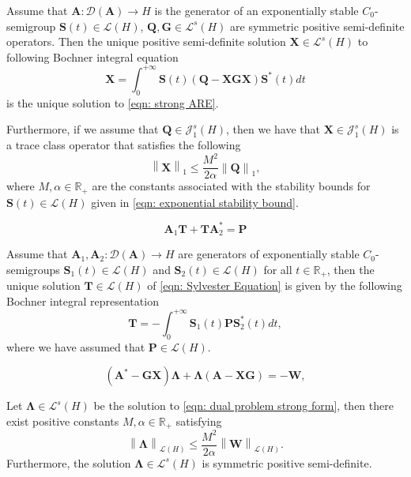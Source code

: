 \documentclass[10pt,a4paper]{amsart}
\newcommand{\bA}{\mathbf A}
\newcommand{\bG}{\mathbf G}
\newcommand{\bLambda}{\boldsymbol{\Lambda}}
\newcommand{\bQ}{\mathbf Q}
\newcommand{\bS}{\mathbf S}
\newcommand{\bT}{\mathbf T}
\newcommand{\bW}{\mathbf W}
\newcommand{\bX}{\mathbf X}
\newcommand{\norm}[1]{\left\| #1 \right\|}
\newcommand{\p}[1]{\left( {#1} \right)}
\newcommand{\sJ}{\mathscr J}
\newcommand{\sL}{\mathscr L}
\begin{document}
\begin{theorem} \label{theorem: ARE well-posedness}
Assume that $\bA : \mathcal D(\bA) \rightarrow H$ is the generator of an exponentially stable $C_0$-semigroup $\bS(t)\in \sL(H)$, $\bQ, \bG \in \sL^s(H)$ are symmetric positive semi-definite operators. Then the unique positive semi-definite solution $\bX \in \sL^s(H)$ to following Bochner integral equation
\begin{equation} \label{eqn: Bochner ARE}
    \bX = \int_0^{+\infty} \bS(t)\p{\bQ - \bX \bG \bX}\bS^*(t)dt
\end{equation}
is the unique solution to \eqref{eqn: strong ARE}. 

Furthermore, if we assume that $\bQ \in \sJ^s_1(H)$, then we have that $\bX \in \sJ_1^s(H)$ is a trace class operator that satisfies the following
\begin{equation} \label{eqn: ARE solution bound}
    \norm{\bX}_{1} \leq \frac{M^2}{2\alpha} \norm{\bQ}_{1},
\end{equation}
where $M,\alpha \in \mathbb R_+$ are the constants associated with the stability bounds for $\bS(t) \in \sL(H)$ given in \eqref{eqn: exponential stability bound}.
\end{theorem}

\begin{equation} \label{eqn: Sylvester Equation}
    \bA_1 \bT + \bT \bA_2^* = \mathbf P
\end{equation}

\begin{lemma} \label{lemma: Sylvester Equation}
    Assume that $\bA_1, \bA_2: \mathcal D(\bA) \rightarrow H$ are generators of exponentially stable $C_0$-semigroups $\bS_1(t) \in \sL\p{H}$ and $\bS_2(t) \in \sL\p{H}$ for all $t \in \mathbb R_+$, then the unique solution $\mathbf T \in \sL\p{H}$ of \eqref{eqn: Sylvester Equation} is given by the following Bochner integral representation
    \begin{equation} \label{eqn: sylvester solution}
        \bT = - \int_0^{+\infty} \bS_1(t)\mathbf P \bS_2^*(t)dt,
    \end{equation}
    where we have assumed that $\mathbf P \in \sL\p{H}$.
\end{lemma}

\begin{equation} \label{eqn: dual problem strong form}
    \p{\bA^* - \bG\bX}\bLambda + \bLambda\p{\bA-\bX\bG} = -\bW,
\end{equation}

\begin{lemma} \label{lemma: Lambda bound}
    Let $\bLambda \in \sL^s(H)$ be the solution to \eqref{eqn: dual problem strong form}, then there exist positive constants $M, \alpha \in \mathbb R_+$ satisfying
    $$
    \norm{\bLambda}_{\sL\p{H}} \leq \frac{M^2}{2\alpha}\norm{\bW}_{\sL(H)}.
    $$
    Furthermore, the solution $\bLambda \in \sL^s(H)$ is symmetric positive semi-definite.
\end{lemma}
\end{document}
